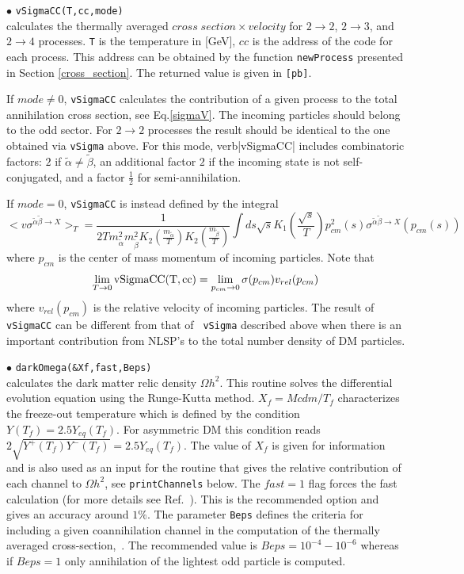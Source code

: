 \documentclass[12pt,a4paper]{article}
\begin{document}
 

\noindent
 $\bullet$    \verb|vSigmaCC(T,cc,mode)|\\
  calculates  the thermally  averaged  $cross\; section
\times velocity$ for $2\to2$, $2\to3$, and $2\to4$ processes. \verb|T| is the temperature in
[GeV],  $cc$ is the address of the code for each process. This address
can be obtained by the function {\tt newProcess} presented in  Section
\ref{cross_section}. The returned value  is given in {\tt [pb]}. 

 If $mode\ne 0$, \verb|vSigmaCC|  calculates  the contribution of a given
process to the total annihilation cross section,  see Eq.\ref{sigmaV}. The
 incoming particles should belong to the odd sector.  For $2\to2$ processes the result should
be identical to the one obtained via {\tt vSigma}  above. For this mode,
verb|vSigmaCC|  includes combinatoric factors: $2$ if $\tilde\alpha \ne
\tilde\beta$, an additional factor $2$ if the incoming state is not self-conjugated, and a factor
$\frac{1}{2}$  for semi-annihilation.   

If $mode=0$, {\tt vSigmaCC} is instead defined by the integral
$$ <v \sigma^{\tilde\alpha\tilde\beta\to X}>_T=  \frac{1}{2 T
m_{\tilde\alpha}^2 m_{\tilde\beta}^2
K_2(\frac{m_{\tilde\alpha}}{T})K_2(\frac{m_{\tilde\beta}}{T})} \int ds \sqrt{s}
K_1(\frac{\sqrt{s}}{T})p_{cm}^2(s)\sigma^{\tilde\alpha\tilde\beta\to X}(p_{cm}(s))$$  
where $p_{cm}$ is the center of mass momentum of incoming particles.  Note that
$$\lim_{T\to 0} {\rm vSigmaCC(T,cc)}=\lim_{p_{cm}\to 0} \sigma(p_{cm}) v_{rel}(p_{cm}) $$ 
where   $v_{rel}(p_{cm})$ is the relative velocity of incoming particles.   The
result of {\tt vSigmaCC} can be different from that of {\tt
vSigma} described  above when there is an important contribution from NLSP's to the total
number density of DM particles. 
 
\noindent 
$\bullet$ \verb|darkOmega(&Xf,fast,Beps)|\\
calculates the dark matter relic density $\Omega h^2$. 
This routine  solves the differential evolution equation  using the Runge-Kutta method. 
$X_f=Mcdm/T_{f}$
characterizes the freeze-out temperature  which is defined by the
condition $Y(T_f)=2.5Y_{eq}(T_f)$. For  asymmetric  DM this condition
reads $2\sqrt{Y^+(T_f)Y^-(T_f)}=2.5Y_{eq}(T_f)$.  The value of $X_f$ is given for
information and is also used as an input for the routine that
gives the relative contribution of each channel to $\Omega h^2$,
see \verb|printChannels|  below. The  $fast=1$ flag forces the
fast calculation (for more details see
Ref.~\cite{Belanger:2004yn}). This is the recommended option and
gives an accuracy around $1\%$. The parameter {\tt Beps} defines the
criteria for including a given coannihilation channel in the computation of the
thermally averaged cross-section,~\cite{Belanger:2004yn}.   The
recommended value is $Beps=10^{-4} - 10^{-6}$ whereas 
if $Beps=1$ only annihilation of the
lightest odd particle is computed.
   
\end{document}
